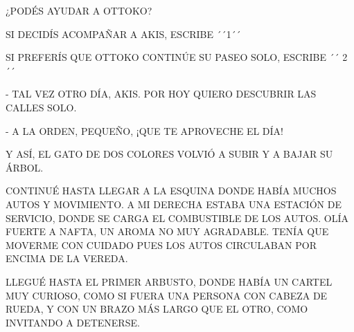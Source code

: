 \newpage
{}
\newpage
{}
\vspace{.3\textheight}


\begin{LARGE}
	¿PODÉS AYUDAR A OTTOKO?
\end{LARGE}

SI DECIDÍS ACOMPAÑAR A AKIS, ESCRIBE ´´1´´

SI PREFERÍS QUE OTTOKO CONTINÚE SU PASEO SOLO, ESCRIBE  ´´ 2´´ 





\newpage
{}
- TAL VEZ OTRO DÍA, AKIS. POR HOY QUIERO DESCUBRIR LAS CALLES SOLO.

- A LA ORDEN, PEQUEÑO, ¡QUE TE APROVECHE EL DÍA!

Y ASÍ, EL GATO DE DOS COLORES VOLVIÓ A SUBIR Y A BAJAR SU ÁRBOL.

CONTINUÉ HASTA LLEGAR A LA ESQUINA DONDE HABÍA MUCHOS AUTOS Y MOVIMIENTO. A MI DERECHA ESTABA UNA ESTACIÓN DE SERVICIO, DONDE SE CARGA EL COMBUSTIBLE DE LOS AUTOS. OLÍA FUERTE A NAFTA, UN AROMA NO MUY AGRADABLE. TENÍA QUE MOVERME CON CUIDADO PUES LOS AUTOS CIRCULABAN POR ENCIMA DE LA VEREDA.

LLEGUÉ HASTA EL PRIMER ARBUSTO, DONDE HABÍA UN CARTEL MUY CURIOSO, COMO SI FUERA UNA PERSONA CON CABEZA DE RUEDA, Y CON UN BRAZO MÁS LARGO QUE EL OTRO, COMO INVITANDO A DETENERSE.



\newpage
{}


